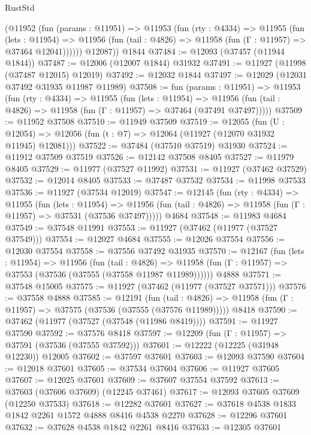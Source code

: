 \begin{lexlean}{RustStd}
\begin{coremodule}
        (@11952
          (fun (params : @11951) =>
          @11953
            (fun (rty : @4334) =>
            @11955
              (fun (lets : @11954) =>
              @11956 (fun (tail : @4826) => @11958 (fun (Γ : @11957) => @37464 @12041))))))
        @12087))
    @1844
@37484 := @12093 (@37457 (@11944 @1844))
@37487 := @12006 (@12007 @1844) @31932
@37491 := @11927 (@11998 (@37487 @12015) @12019)
@37492 := @12032 @1844
@37497 := @12029 (@12031 @37492 @31935 @11987 @11989)
@37508 := fun (params : @11951) =>
  @11953
    (fun (rty : @4334) =>
    @11955
      (fun (lets : @11954) =>
      @11956 (fun (tail : @4826) => @11958 (fun (Γ : @11957) => @37464 (@37491 @37497)))))
@37509 := @11952 @37508
@37510 := @11949 @37509
@37519 := @12055
    (fun (U : @12054) => @12056 (fun (t : @7) => @12064 (@11927 (@12070 @31932 @11945) @12081)))
@37522 := @37484 (@37510 @37519) @31930
@37524 := @11912 @37509 @37519
@37526 := @12142 @37508 @8405
@37527 := @11979 @8405
@37529 := @11977 (@37527 @11992)
@37531 := @11927 (@37462 @37529)
@37532 := @12014 @8405
@37533 := @37487 @37532
@37534 := @11998 @37533
@37536 := @11927 (@37534 @12019)
@37547 := @12145
    (fun (rty : @4334) =>
    @11955
      (fun (lets : @11954) =>
      @11956 (fun (tail : @4826) => @11958 (fun (Γ : @11957) => @37531 (@37536 @37497)))))
    @4684
@37548 := @11983 @4684
@37549 := @37548 @11991
@37553 := @11927 (@37462 (@11977 (@37527 @37549)))
@37554 := @12027 @4684
@37555 := @12026 @37554
@37556 := @12030 @37554
@37558 := @37556 @37492 @31935
@37570 := @12167
    (fun (lets : @11954) =>
    @11956
      (fun (tail : @4826) =>
      @11958 (fun (Γ : @11957) => @37553 (@37536 (@37555 (@37558 @11987 @11989))))))
    @4888
@37571 := @37548 @15005
@37575 := @11927 (@37462 (@11977 (@37527 @37571)))
@37576 := @37558 @4888
@37585 := @12191
    (fun (tail : @4826) => @11958 (fun (Γ : @11957) => @37575 (@37536 (@37555 (@37576 @11989)))))
    @8418
@37590 := @37462 (@11977 (@37527 (@37548 (@11986 @8419))))
@37591 := @11927 @37590
@37592 := @37576 @8418
@37597 := @12209 (fun (Γ : @11957) => @37591 (@37536 (@37555 @37592)))
@37601 := @12222 (@12225 (@31948 @12230)) @12005
@37602 := @37597 @37601
@37603 := @12093 @37590
@37604 := @12018 @37601
@37605 := @37534 @37604
@37606 := @11927 @37605
@37607 := @12025 @37601
@37609 := @37607 @37554 @37592
@37613 := @37603 (@37606 @37609) (@12245 @37461)
@37617 := @12093 @37605 @37609 (@12250 @37533)
@37618 := @12282 @37601
@37627 := @37618 @4538 @1833 @1842 @2261 @1572 @4888 @8416 @4538 @2270
@37628 := @12296 @37601
@37632 := @37628 @4538 @1842 @2261 @8416
@37633 := @12305 @37601

\end{coremodule}
\end{lexlean}
